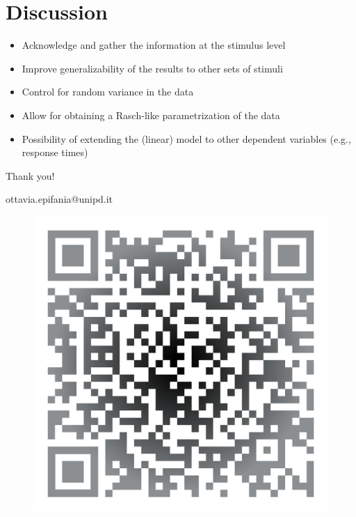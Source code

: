 \documentclass[compress]{beamer}
\begin{document}
\section{Discussion}

\begin{frame}
	\begin{itemize}
		\item Acknowledge and gather the information at the stimulus level
	\item Improve generalizability of the results to other sets of stimuli 

\item Control for random variance in the data 

\item Allow for obtaining a Rasch-like parametrization of the data 

\item Possibility of extending the (linear) model to other dependent variables (e.g., response times)
		
	\end{itemize}
\end{frame}


\begin{frame}
	\begin{center}
		\begin{Large}
			Thank you!
		\end{Large}
		
		\vspace{2.5mm}
		ottavia.epifania@unipd.it
	\end{center}
	
	\vspace{5mm}
	\begin{figure}
		\centering
		\includegraphics[width=0.3\linewidth]{img/qr}
	\end{figure}
	
	
\end{frame}
\end{document}
